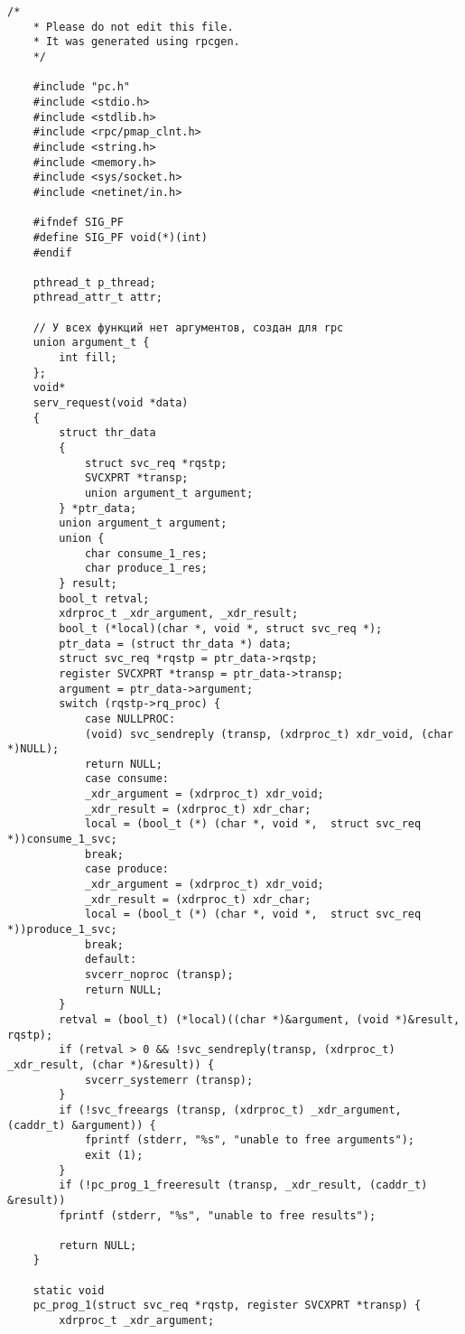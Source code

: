\begin{lstlisting}[caption={<<Модифицированный файл pc\_svc.c с кодом многопоточного rpc сервер>>}]
	/*
	* Please do not edit this file.
	* It was generated using rpcgen.
	*/
	
	#include "pc.h"
	#include <stdio.h>
	#include <stdlib.h>
	#include <rpc/pmap_clnt.h>
	#include <string.h>
	#include <memory.h>
	#include <sys/socket.h>
	#include <netinet/in.h>
	
	#ifndef SIG_PF
	#define SIG_PF void(*)(int)
	#endif
	
	pthread_t p_thread;
	pthread_attr_t attr;
	
	// У всех функций нет аргументов, создан для rpc
	union argument_t {
		int fill;
	};
	void*
	serv_request(void *data)
	{
		struct thr_data
		{
			struct svc_req *rqstp;
			SVCXPRT *transp;
			union argument_t argument;
		} *ptr_data;
		union argument_t argument;
		union {
			char consume_1_res;
			char produce_1_res;
		} result;
		bool_t retval;
		xdrproc_t _xdr_argument, _xdr_result;
		bool_t (*local)(char *, void *, struct svc_req *);
		ptr_data = (struct thr_data *) data;
		struct svc_req *rqstp = ptr_data->rqstp;
		register SVCXPRT *transp = ptr_data->transp;
		argument = ptr_data->argument;
		switch (rqstp->rq_proc) {
			case NULLPROC:
			(void) svc_sendreply (transp, (xdrproc_t) xdr_void, (char *)NULL);
			return NULL;
			case consume:
			_xdr_argument = (xdrproc_t) xdr_void;
			_xdr_result = (xdrproc_t) xdr_char;
			local = (bool_t (*) (char *, void *,  struct svc_req *))consume_1_svc;
			break;
			case produce:
			_xdr_argument = (xdrproc_t) xdr_void;
			_xdr_result = (xdrproc_t) xdr_char;
			local = (bool_t (*) (char *, void *,  struct svc_req *))produce_1_svc;
			break;
			default:
			svcerr_noproc (transp);
			return NULL;
		}
		retval = (bool_t) (*local)((char *)&argument, (void *)&result, rqstp);
		if (retval > 0 && !svc_sendreply(transp, (xdrproc_t) _xdr_result, (char *)&result)) {
			svcerr_systemerr (transp);
		}
		if (!svc_freeargs (transp, (xdrproc_t) _xdr_argument, (caddr_t) &argument)) {
			fprintf (stderr, "%s", "unable to free arguments");
			exit (1);
		}
		if (!pc_prog_1_freeresult (transp, _xdr_result, (caddr_t) &result))
		fprintf (stderr, "%s", "unable to free results");
		
		return NULL;
	}
	
	static void
	pc_prog_1(struct svc_req *rqstp, register SVCXPRT *transp) {
		xdrproc_t _xdr_argument;
		

\end{lstlisting}
